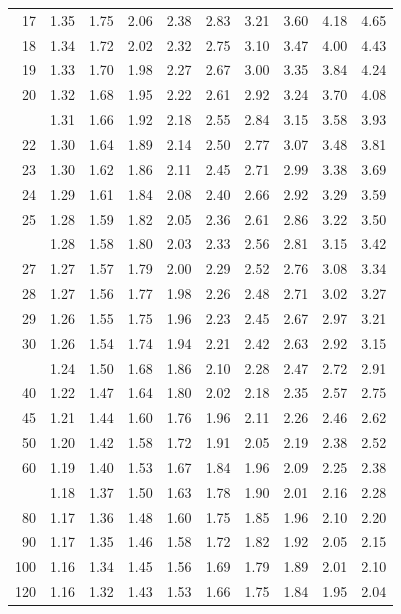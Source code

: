 \documentclass[10pt]{article}
\begin{document}
\begin{longtable}{@{}r!{\vrule width 0.8pt\hspace{0.55em}}rrrrrrrrr@{}}
17 & 1.35 & 1.75 & 2.06 & 2.38 & 2.83 & 3.21 & 3.60 & 4.18 & 4.65 \\
18 & 1.34 & 1.72 & 2.02 & 2.32 & 2.75 & 3.10 & 3.47 & 4.00 & 4.43 \\
19 & 1.33 & 1.70 & 1.98 & 2.27 & 2.67 & 3.00 & 3.35 & 3.84 & 4.24 \\
20 & 1.32 & 1.68 & 1.95 & 2.22 & 2.61 & 2.92 & 3.24 & 3.70 & 4.08 \\
 & 1.31 & 1.66 & 1.92 & 2.18 & 2.55 & 2.84 & 3.15 & 3.58 & 3.93 \\
22 & 1.30 & 1.64 & 1.89 & 2.14 & 2.50 & 2.77 & 3.07 & 3.48 & 3.81 \\
23 & 1.30 & 1.62 & 1.86 & 2.11 & 2.45 & 2.71 & 2.99 & 3.38 & 3.69 \\
24 & 1.29 & 1.61 & 1.84 & 2.08 & 2.40 & 2.66 & 2.92 & 3.29 & 3.59 \\
25 & 1.28 & 1.59 & 1.82 & 2.05 & 2.36 & 2.61 & 2.86 & 3.22 & 3.50 \\
 & 1.28 & 1.58 & 1.80 & 2.03 & 2.33 & 2.56 & 2.81 & 3.15 & 3.42 \\
27 & 1.27 & 1.57 & 1.79 & 2.00 & 2.29 & 2.52 & 2.76 & 3.08 & 3.34 \\
28 & 1.27 & 1.56 & 1.77 & 1.98 & 2.26 & 2.48 & 2.71 & 3.02 & 3.27 \\
29 & 1.26 & 1.55 & 1.75 & 1.96 & 2.23 & 2.45 & 2.67 & 2.97 & 3.21 \\
30 & 1.26 & 1.54 & 1.74 & 1.94 & 2.21 & 2.42 & 2.63 & 2.92 & 3.15 \\
 & 1.24 & 1.50 & 1.68 & 1.86 & 2.10 & 2.28 & 2.47 & 2.72 & 2.91 \\
40 & 1.22 & 1.47 & 1.64 & 1.80 & 2.02 & 2.18 & 2.35 & 2.57 & 2.75 \\
45 & 1.21 & 1.44 & 1.60 & 1.76 & 1.96 & 2.11 & 2.26 & 2.46 & 2.62 \\
50 & 1.20 & 1.42 & 1.58 & 1.72 & 1.91 & 2.05 & 2.19 & 2.38 & 2.52 \\
60 & 1.19 & 1.40 & 1.53 & 1.67 & 1.84 & 1.96 & 2.09 & 2.25 & 2.38 \\
 & 1.18 & 1.37 & 1.50 & 1.63 & 1.78 & 1.90 & 2.01 & 2.16 & 2.28 \\
80 & 1.17 & 1.36 & 1.48 & 1.60 & 1.75 & 1.85 & 1.96 & 2.10 & 2.20 \\
90 & 1.17 & 1.35 & 1.46 & 1.58 & 1.72 & 1.82 & 1.92 & 2.05 & 2.15 \\
100 & 1.16 & 1.34 & 1.45 & 1.56 & 1.69 & 1.79 & 1.89 & 2.01 & 2.10 \\
120 & 1.16 & 1.32 & 1.43 & 1.53 & 1.66 & 1.75 & 1.84 & 1.95 & 2.04 \\

\end{longtable}
\end{document}

